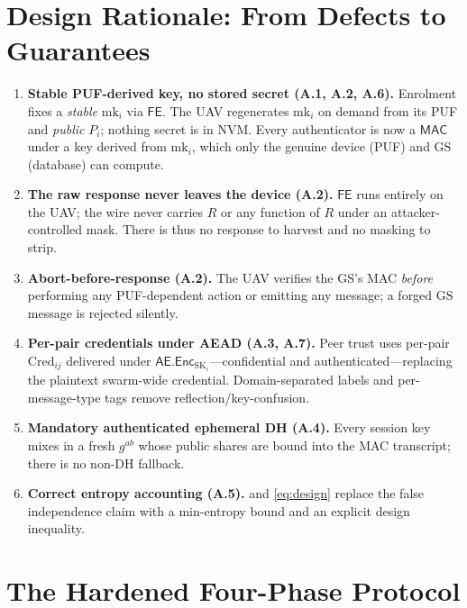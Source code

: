 \documentclass[11pt]{article}
\theoremstyle{plain}
\theoremstyle{definition}
\newcommand{\GS}{\mathrm{GS}}
\newcommand{\Cred}{\mathrm{Cred}}
\newcommand{\mk}{\mathrm{mk}}
\newcommand{\SK}{\mathrm{SK}}
\newcommand{\MAC}{\mathsf{MAC}}
\newcommand{\aead}{\mathsf{AE}}
\newcommand{\Enc}{\mathsf{Enc}}
\newcommand{\FE}{\mathsf{FE}}
\begin{document}
\section{Design Rationale: From Defects to Guarantees}
\label{sec:rationale}
\begin{enumerate}[leftmargin=1.5em,label=\textbf{D\arabic*.}]
\item \textbf{Stable PUF-derived key, no stored secret (A.1, A.2, A.6).}
Enrolment fixes a \emph{stable} $\mk_i$ via $\FE$. The UAV regenerates
$\mk_i$ on demand from its PUF and \emph{public} $P_i$; nothing secret is in
NVM. Every authenticator is now a $\MAC$ under a key derived from $\mk_i$,
which only the genuine device (PUF) and $\GS$ (database) can compute.
\item \textbf{The raw response never leaves the device (A.2).}
$\FE$ runs entirely on the UAV; the wire never carries $R$ or any
function of $R$ under an attacker-controlled mask. There is thus no
response to harvest and no masking to strip.
\item \textbf{Abort-before-response (A.2).}
The UAV verifies the $\GS$'s MAC \emph{before} performing any PUF-dependent
action or emitting any message; a forged $\GS$ message is rejected silently.
\item \textbf{Per-pair credentials under AEAD (A.3, A.7).}
Peer trust uses per-pair $\Cred_{ij}$ delivered under
$\aead.\Enc_{\SK_i}$---confidential and authenticated---replacing the plaintext
swarm-wide credential. Domain-separated labels and per-message-type tags
remove reflection/key-confusion.
\item \textbf{Mandatory authenticated ephemeral DH (A.4).}
Every session key mixes in a fresh $g^{ab}$ whose public shares are bound
into the MAC transcript; there is no non-DH fallback.
\item \textbf{Correct entropy accounting (A.5).}
 and \cref{eq:design} replace the false independence claim with
a min-entropy bound and an explicit design inequality.
\end{enumerate}

\section{The Hardened Four-Phase Protocol}
\label{sec:phases}
\end{document}
